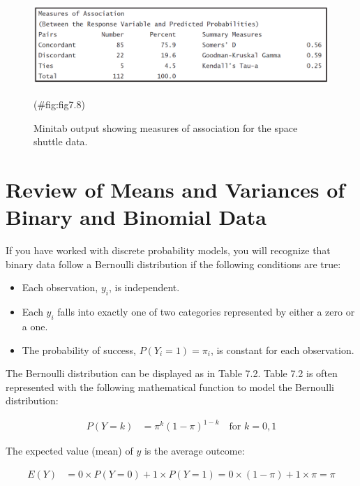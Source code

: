 \documentclass[
]{report}
\providecommand{\tightlist}{%
  \setlength{\itemsep}{0pt}\setlength{\parskip}{0pt}}
\begin{document}
\begin{figure}

{\centering \includegraphics[width=1\linewidth]{docs/Fig7_8MinitabPairs} 

}

\caption{Minitab output showing measures of association for the space shuttle data.}(\#fig:fig7.8)
\end{figure}

\section{\texorpdfstring{\textbf{Review of Means and Variances of Binary and Binomial Data}}{Review of Means and Variances of Binary and Binomial Data}}\label{review-of-means-and-variances-of-binary-and-binomial-data}

If you have worked with discrete probability models, you will recognize that binary data follow a Bernoulli distribution if the following conditions are true:

\begin{itemize}
\tightlist
\item
  Each observation, \(y_i\), is independent.
\item
  Each \(y_i\) falls into exactly one of two categories represented by either a zero or a one.
\item
  The probability of success, \(P(Y_i = 1) = \pi_i\), is constant for each observation.
\end{itemize}

The Bernoulli distribution can be displayed as in Table 7.2.
Table 7.2 is often represented with the following mathematical function to model the Bernoulli distribution:

\begin{align}
P(Y = k) &= \pi^k (1 - \pi)^{1-k} \quad \text{for } k = 0, 1 \tag{7.17}
\end{align}

The expected value (mean) of \(y\) is the average outcome:

\begin{align}
E(Y) &= 0 \times P(Y = 0) + 1 \times P(Y = 1) = 0 \times (1 - \pi) + 1 \times \pi = \pi \tag{7.18}
\end{align}
\end{document}
